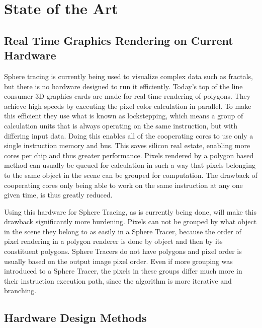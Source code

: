 \chapter{State of the Art}

\section{ Real Time Graphics Rendering on Current Hardware } 

Sphere tracing is currently being used to visualize complex data such as 
fractals, but there is no hardware designed to run it efficiently. Today's top 
of the line consumer 3D graphics cards are made for real time rendering of 
polygons. They achieve high speeds by executing the pixel color calculation in 
parallel. To make this efficient they use what is known as lockstepping, which 
means a group of calculation units that is always operating on the same 
instruction, but with differing input data. Doing this enables all of the 
cooperating cores to use only a single instruction memory and bus. This saves 
silicon real estate, enabling more cores per chip and thus greater performance. 
Pixels rendered by a polygon based method can usually be queued for calculation 
in such a way that pixels belonging to the same object in the scene can be 
grouped for computation. The drawback of cooperating cores only being able 
to work on the same instruction at any one given time, is thus greatly reduced.

Using this hardware for Sphere Tracing, as is currently being done, will make 
this drawback significantly more burdening. Pixels can not be grouped by
what object in the scene they belong to as easily in a Sphere Tracer, because
the order of pixel rendering in a polygon renderer is done by object and then
by its constituent polygons. Sphere Tracers do not have polygons and pixel 
order is usually based on the output image pixel order. Even if more grouping 
was introduced to a Sphere Tracer, the pixels in these groups differ much more 
in their instruction execution path, since the algorithm is more iterative and 
branching.

\section{ Hardware Design Methods  } 

